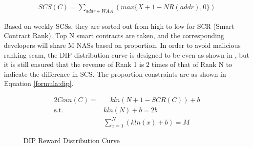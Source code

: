 \begin{align}
\label{formula:dip:scs}
SCS(C)=\sum_{addr \in WAA}(max\{X + 1 - NR(addr), 0\})
\end{align}

Based on weekly SCSs, they are sorted out from high to low for SCR (Smart Contract Rank). Top N smart contracts are taken, and the corresponding developers will share M NASs based on proportion. In order to avoid malicious ranking scam, the DIP distribution curve is designed to be even as shown in , but it is still ensured that the revenue of Rank 1 is 2 times of that of Rank N to indicate the difference in SCS. The proportion constraints are as shown in Equation \ref{formula:dip}.


\begin{alignat}{2}
Coin(C) = & \quad kln(N+1-SCR(C))+b \label{formula:dip} \\
\mbox{s.t.}\quad & kln(N) + b = 2b \nonumber \\
& \sum_{x=1}^{N}(kln(x) + b) = M \nonumber
\end{alignat}

\begin{figure}[h]
\centering
{}
\caption{DIP Reward Distribution Curve}
\label{fig:dipdis}
\end{figure}

